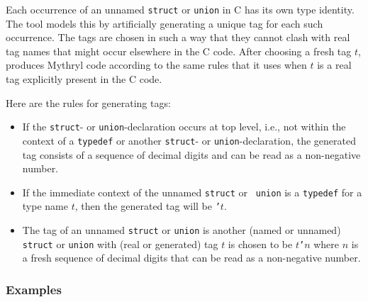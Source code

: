 Each occurrence of an unnamed {\tt struct} or {\tt union} in C has its
own type identity.  The {\cgluemaker} tool models this by artificially
generating a unique tag for each such occurrence.  The tags are chosen
in such a way that they cannot clash with real tag names that might
occur elsewhere in the C code.  After choosing a fresh tag $t$,
{\cgluemaker} produces Mythryl code according to the same rules that it uses
when $t$ is a real tag explicitly present in the C code.

Here are the rules for generating tags:

\begin{itemize}\setlength{\itemsep}{0pt}
\item If the {\tt struct}- or {\tt union}-declaration occurs at top
  level, i.e., not within the context of a {\tt typedef} or another
  {\tt struct}- or {\tt union}-declaration, the generated tag consists
  of a sequence of decimal digits and can be read as a non-negative
  number.
\item If the immediate context of the unnamed {\tt struct} or {\tt
    union} is a {\tt typedef} for a type name $t$, then the generated
  tag will be {\tt '$t$}.
\item The tag of an unnamed {\tt struct} or {\tt union} is another
  (named or unnamed) {\tt struct} or {\tt union} with (real or
  generated) tag $t$ is chosen to be {\tt $t$'$n$} where $n$ is a
  fresh sequence of decimal digits that can be read as a non-negative
  number.
\end{itemize}

\subsubsection*{Examples}

